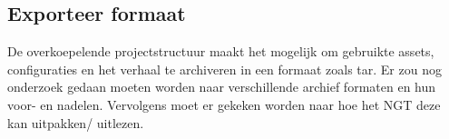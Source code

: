 \subsection{Exporteer formaat}
De overkoepelende projectstructuur maakt het mogelijk om gebruikte assets, configuraties en het verhaal te archiveren in een formaat zoals tar. Er zou nog onderzoek gedaan moeten worden naar verschillende archief formaten en hun voor- en nadelen. Vervolgens moet er gekeken worden naar hoe het NGT deze kan uitpakken/ uitlezen.